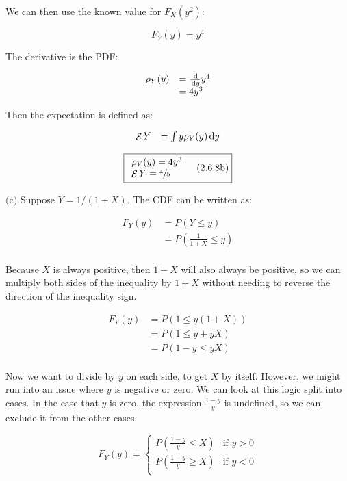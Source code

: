 \documentclass{article}
\newcommand{\subproblem}[3]{$\boxed{\text{(#3)}}$}
\newcommand{\subsolution}[4]{\boxed{#4\quad(\text{#1.#2#3})}}
\renewcommand{\d}[1]{\,\textnormal{d}#1}
\newcommand{\dd}[2]{\frac{\d{#1}}{\d{#2}}}
\DeclareMathOperator{\E}{\mathcal{E}}
\begin{document}
We can then use the known value for $F_X(y^2)$:

\[
F_Y(y)=y^4
\]

The derivative is the PDF:

\[
\begin{array}{ll}
\rho_Y(y)&=\dd{}{y} y^4 \\
&=4y^3 \\
\end{array}
\]

Then the expectation is defined as:

\[
\begin{array}{ll}
\E Y&=\int y\rho_Y(y) \d{y} \\
\end{array}
\]

\[
\subsolution{2.6}{8}{b}{\begin{array}{l}
\rho_Y(y)=4y^3 \\
\E Y=\sfrac{4}{5}
\end{array}}
\]

%
\subproblem{2.6}{8}{c} Suppose $Y=1/(1+X)$. The CDF can be written as:

\[
\begin{array}{rl}
F_Y(y)&=P(Y\le y) \\
&=P\left(\frac{1}{1+X}\le y\right) \\
\end{array}
\]

Because $X$ is always positive, then $1+X$ will also always be
positive, so we can multiply both sides of the inequality by $1+X$
without needing to reverse the direction of the inequality sign.

\[
\begin{array}{rl}
F_Y(y)&=P(1\le y(1+X)) \\
&=P(1\le y+yX) \\
&=P(1-y\le yX) \\
\end{array}
\]

Now we want to divide by $y$ on each side, to get $X$ by
itself. However, we might run into an issue where $y$ is negative or
zero. We can look at this logic split into cases. In the case that $y$
is zero, the expression $\frac{1-y}{y}$ is undefined, so we can
exclude it from the other cases.

\[
F_Y(y)=\begin{cases}
P\left(\frac{1-y}{y}\le X\right) &\text{if $y>0$} \\
P\left(\frac{1-y}{y}\ge X\right) &\text{if $y<0$} \\
\end{cases}
\]
\end{document}
